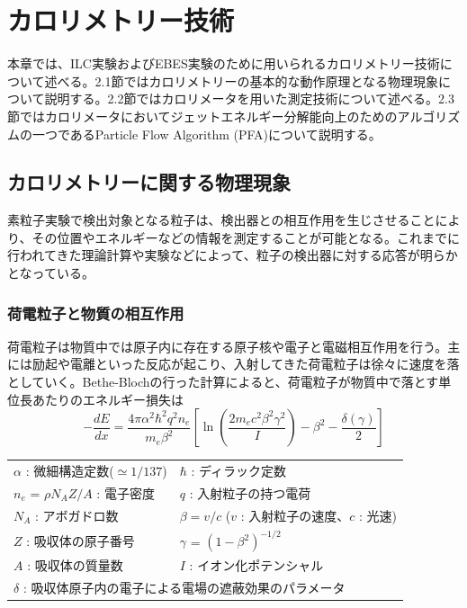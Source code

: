 
\chapter{カロリメトリー技術} \label{sec:DeepLearning}
本章では、ILC実験およびEBES実験のために用いられるカロリメトリー技術について述べる。2.1節ではカロリメトリーの基本的な動作原理となる物理現象について説明する。2.2節ではカロリメータを用いた測定技術について述べる。2.3節ではカロリメータにおいてジェットエネルギー分解能向上のためのアルゴリズムの一つであるParticle Flow Algorithm (PFA)について説明する。
\section{カロリメトリーに関する物理現象}
素粒子実験で検出対象となる粒子は、検出器との相互作用を生じさせることにより、その位置やエネルギーなどの情報を測定することが可能となる。これまでに行われてきた理論計算や実験などによって、粒子の検出器に対する応答が明らかとなっている。
\subsection{荷電粒子と物質の相互作用}
荷電粒子は物質中では原子内に存在する原子核や電子と電磁相互作用を行う。主には励起や電離といった反応が起こり、入射してきた荷電粒子は徐々に速度を落としていく。Bethe-Blochの行った計算によると、荷電粒子が物質中で落とす単位長あたりのエネルギー損失は
\begin{equation}
-\frac{dE}{dx} = \frac{4\pi \alpha^2 \hbar^2 q^2 n_e}{m_e\beta^2}\left[\ln\left(\frac{2m_ec^2 \beta^2\gamma^2}{I}\right)-\beta^2-\frac{\delta(\gamma)}{2}\right]
\end{equation}

\begin{table}[H]
	\begin{center}
		\begin{tabular}{ll}
			$\alpha$ : 微細構造定数($\simeq 1/137$) & $\hbar$ : ディラック定数\\
			$n_e$ = $\rho N_A Z/A$ : 電子密度& $q$ : 入射粒子の持つ電荷 \\
			$N_A$ : アボガドロ数 & $\beta = v / c$ ($v$ : 入射粒子の速度、$c$ : 光速) \\
			$Z$ : 吸収体の原子番号 & $\gamma$ = $(1-\beta^2)^{-1/2}$ \\
			$A$ : 吸収体の質量数 & $I$ : イオン化ポテンシャル \\
			\multicolumn{2}{l}{$\delta$ : 吸収体原子内の電子による電場の遮蔽効果のパラメータ} \\
		\end{tabular}
	\end{center}
\end{table}

